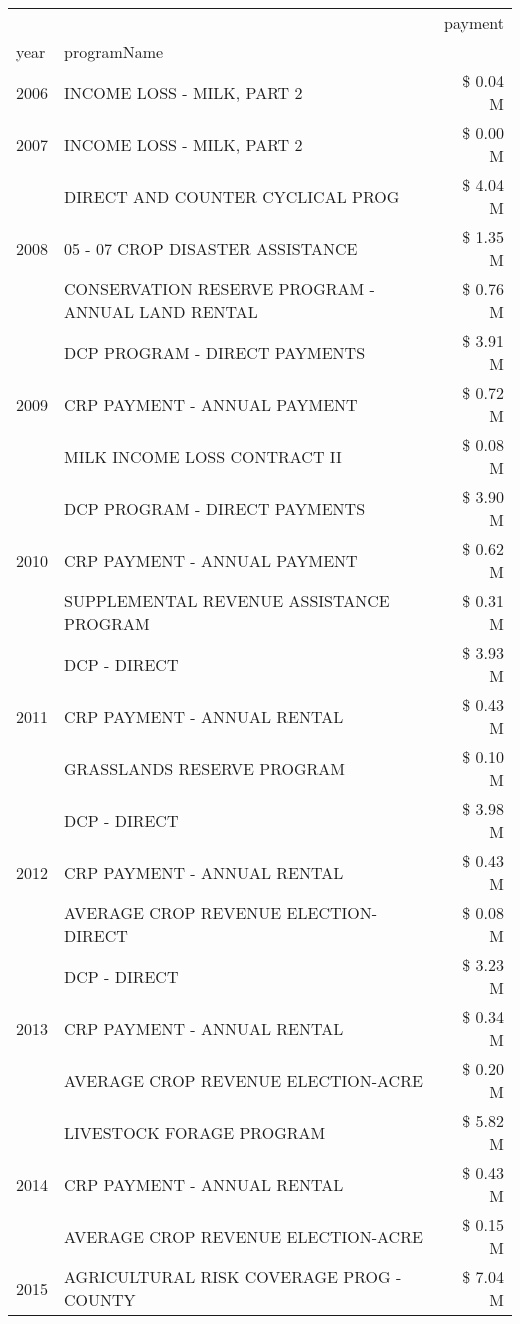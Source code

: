 \begin{tabular}{llr}
\toprule
 &  & payment \\
year & programName &  \\
\midrule
2006 & INCOME LOSS - MILK, PART 2 & \$ 0.04 M \\
\cline{1-3}
2007 & INCOME LOSS - MILK, PART 2 & \$ 0.00 M \\
\cline{1-3}
\multirow[t]{3}{*}{2008} & DIRECT AND COUNTER CYCLICAL PROG & \$ 4.04 M \\
 & 05 - 07 CROP DISASTER ASSISTANCE & \$ 1.35 M \\
 & CONSERVATION RESERVE PROGRAM - ANNUAL LAND RENTAL & \$ 0.76 M \\
\cline{1-3}
\multirow[t]{3}{*}{2009} & DCP PROGRAM - DIRECT PAYMENTS & \$ 3.91 M \\
 & CRP PAYMENT - ANNUAL PAYMENT & \$ 0.72 M \\
 & MILK INCOME LOSS CONTRACT II & \$ 0.08 M \\
\cline{1-3}
\multirow[t]{3}{*}{2010} & DCP PROGRAM - DIRECT PAYMENTS & \$ 3.90 M \\
 & CRP PAYMENT - ANNUAL PAYMENT & \$ 0.62 M \\
 & SUPPLEMENTAL REVENUE ASSISTANCE PROGRAM & \$ 0.31 M \\
\cline{1-3}
\multirow[t]{3}{*}{2011} & DCP - DIRECT & \$ 3.93 M \\
 & CRP PAYMENT - ANNUAL RENTAL & \$ 0.43 M \\
 & GRASSLANDS RESERVE PROGRAM & \$ 0.10 M \\
\cline{1-3}
\multirow[t]{3}{*}{2012} & DCP - DIRECT & \$ 3.98 M \\
 & CRP PAYMENT - ANNUAL RENTAL & \$ 0.43 M \\
 & AVERAGE CROP REVENUE ELECTION-DIRECT & \$ 0.08 M \\
\cline{1-3}
\multirow[t]{3}{*}{2013} & DCP - DIRECT & \$ 3.23 M \\
 & CRP PAYMENT - ANNUAL RENTAL & \$ 0.34 M \\
 & AVERAGE CROP REVENUE ELECTION-ACRE & \$ 0.20 M \\
\cline{1-3}
\multirow[t]{3}{*}{2014} & LIVESTOCK FORAGE PROGRAM & \$ 5.82 M \\
 & CRP PAYMENT - ANNUAL RENTAL & \$ 0.43 M \\
 & AVERAGE CROP REVENUE ELECTION-ACRE & \$ 0.15 M \\
\cline{1-3}
\multirow[t]{3}{*}{2015} & AGRICULTURAL RISK COVERAGE PROG - COUNTY & \$ 7.04 M \\

\end{tabular}
